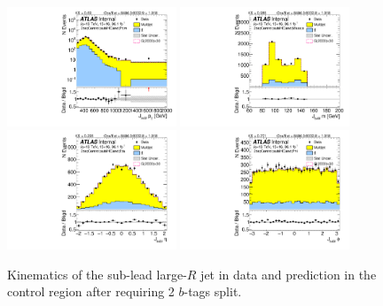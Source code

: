\begin{figure}[htbp!]
\begin{center}
\includegraphics[angle=270, width=0.45\textwidth]{./figures/boosted/Control/b77_TwoTag_split_Control_sublHCand_Pt_m_1.pdf}
\includegraphics[angle=270, width=0.45\textwidth]{./figures/boosted/Control/b77_TwoTag_split_Control_sublHCand_Mass_s.pdf}\\
\includegraphics[angle=270, width=0.45\textwidth]{./figures/boosted/Control/b77_TwoTag_split_Control_sublHCand_Eta.pdf}
\includegraphics[angle=270, width=0.45\textwidth]{./figures/boosted/Control/b77_TwoTag_split_Control_sublHCand_Phi.pdf}
  \caption{Kinematics of the sub-lead large-$R$ jet in data and prediction in the control region after requiring 2 $b$-tags split. }
  \label{fig:boosted-2bs-control-ak10-subl}
\end{center}
\end{figure}

